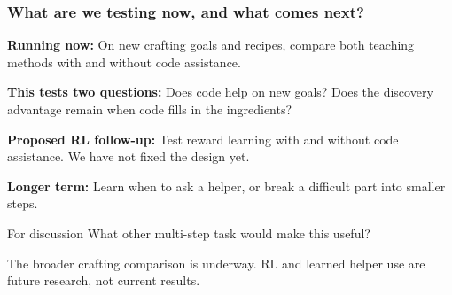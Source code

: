 \documentclass[aspectratio=169,12pt]{beamer}
\newcommand{\aside}[1]{\vfill{\footnotesize\color{Gray}#1\par}}
\begin{document}
\begin{frame}[t]
\frametitle{What are we testing now, and what comes next?}
\textbf{Running now:} On new crafting goals and recipes, compare both teaching methods with and without code assistance.
\medskip

\textbf{This tests two questions:} Does code help on new goals? Does the discovery advantage remain when code fills in the ingredients?
\medskip

\textbf{Proposed RL follow-up:} Test reward learning with and without code assistance. We have not fixed the design yet.
\medskip

\textbf{Longer term:} Learn when to ask a helper, or break a difficult part into smaller steps.
\begin{block}{For discussion}
What other multi-step task would make this useful?
\end{block}
\aside{The broader crafting comparison is underway. RL and learned helper use are future research, not current results.}
\end{frame}
\end{document}
